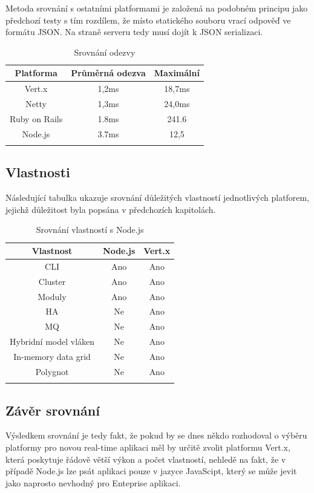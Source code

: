 Metoda srovnání s ostatními platformami je založená na podobném principu jako předchozí testy s tím rozdílem, že místo statického souboru vrací odpověď ve formátu JSON. Na straně serveru tedy musí dojít k JSON serializaci.

\begin{flushleft}
\begin{longtable}{|c|c|c|}
\hline
\textsf{\textbf{Platforma}} & \textsf{\textbf{Průměrná odezva}} & \textsf{\textbf{Maximální}}\tabularnewline
\hline
Vert.x & 1,2ms & 18,7ms\tabularnewline
\hline 
Netty & 1,3ms & 24,0ms\tabularnewline
\hline
Ruby on Rails & 1.8ms & 241.6\tabularnewline
\hline 
Node.js & 3.7ms & 12,5\tabularnewline
\hline 

\caption{Srovnání odezvy}
\label{table:odezvy}
\end{longtable}
\end{flushleft}

\subsection{Vlastnosti}

Následující tabulka ukazuje srovnání důležitých vlastností jednotlivých platforem, jejichž důležitost byla popsána v předchozích kapitolách.

\begin{flushleft}
\begin{longtable}{|c|c|c|}
\hline
\textsf{\textbf{Vlastnost}} & \textsf{\textbf{Node.js}} & \textsf{\textbf{Vert.x}}\tabularnewline
\hline
CLI & Ano & Ano\tabularnewline
\hline 
Cluster & Ano & Ano\tabularnewline
\hline
Moduly & Ano & Ano\tabularnewline
\hline 
HA & Ne & Ano\tabularnewline
\hline
MQ & Ne & Ano\tabularnewline
\hline 
Hybridní model vláken & Ne & Ano\tabularnewline
\hline 
In-memory data grid & Ne & Ano\tabularnewline
\hline 
Polygnot & Ne & Ano\tabularnewline
\hline
\caption{Srovnání vlastností s Node.js}
\end{longtable}
\par\end{flushleft}

\subsection{Závěr srovnání}

Výsledkem srovnání je tedy fakt, že pokud by se dnes někdo rozhodoval o výběru platformy pro novou real-time aplikaci měl by určitě zvolit platformu Vert.x, která poskytuje řádově větší výkon a počet vlastností, nehledě na fakt, že v případě Node.js lze psát aplikaci pouze v jazyce JavaScipt, který se může jevit jako naprosto nevhodný pro Enteprise aplikaci.